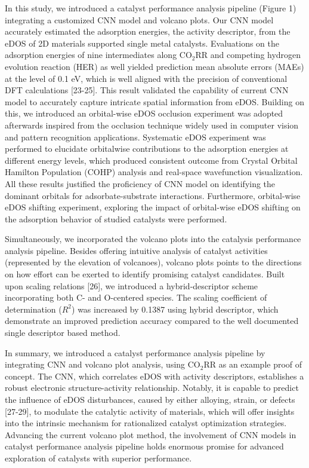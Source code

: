 In this study, we introduced a catalyst performance analysis pipeline (Figure 1) integrating a customized CNN model and volcano plots.
Our CNN model accurately estimated the adsorption energies, the activity descriptor, from the eDOS of 2D materials supported single metal catalysts.
Evaluations on the adsorption energies of nine intermediates along CO$_2$RR and competing hydrogen evolution reaction (HER) as well yielded prediction mean absolute errors (MAEs) at the level of 0.1 eV, which is well aligned with the precision of conventional DFT calculations [23-25].
This result validated the capability of current CNN model to accurately capture intricate spatial information from eDOS.
Building on this, we introduced an orbital-wise eDOS occlusion experiment was adopted afterwards inspired from the occlusion technique widely used in computer vision and pattern recognition applications.
Systematic eDOS experiment was performed to elucidate orbitalwise contributions to the adsorption energies at different energy levels, which produced consistent outcome from Crystal Orbital Hamilton Population (COHP) analysis and real-space wavefunction visualization.
All these results justified the proficiency of CNN model on identifying the dominant orbitals for adsorbate-substrate interactions.
Furthermore, orbital-wise eDOS shifting experiment, exploring the impact of orbital-wise eDOS shifting on the adsorption behavior of studied catalysts were performed.

Simultaneously, we incorporated the volcano plots into the catalysis performance analysis pipeline.
Besides offering intuitive analysis of catalyst activities (represented by the elevation of volcanoes), volcano plots points to the directions on how effort can be exerted to identify promising catalyst candidates.
Built upon scaling relations [26], we introduced a hybrid-descriptor scheme incorporating both C- and O-centered species.
The scaling coefficient of determination ($R^2$) was increased by 0.1387 using hybrid descriptor, which demonstrate an improved prediction accuracy compared to the well documented single descriptor based method.

In summary, we introduced a catalyst performance analysis pipeline by integrating CNN and volcano plot analysis, using CO$_2$RR as an example proof of concept.
The CNN, which correlates eDOS with activity descriptors, establishes a robust electronic structure-activity relationship.
Notably, it is capable to predict the influence of eDOS disturbances, caused by either alloying, strain, or defects [27-29], to modulate the catalytic activity of materials, which will offer insights into the intrinsic mechanism for rationalized catalyst optimization strategies.
Advancing the current volcano plot method, the involvement of CNN models in catalyst performance analysis pipeline holds enormous promise for advanced exploration of catalysts with superior performance.
